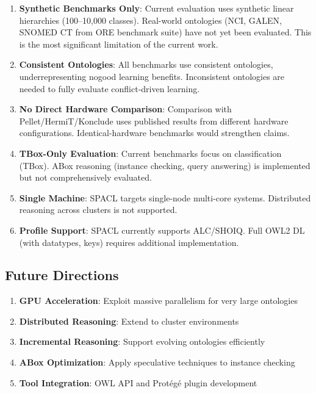\documentclass[preprint,12pt]{elsarticle}
\begin{document}
\begin{enumerate}
    \item \textbf{Synthetic Benchmarks Only}: Current evaluation uses synthetic linear hierarchies (100--10,000 classes). Real-world ontologies (NCI, GALEN, SNOMED CT from ORE benchmark suite) have not yet been evaluated. This is the most significant limitation of the current work.
    
    \item \textbf{Consistent Ontologies}: All benchmarks use consistent ontologies, underrepresenting nogood learning benefits. Inconsistent ontologies are needed to fully evaluate conflict-driven learning.
    
    \item \textbf{No Direct Hardware Comparison}: Comparison with Pellet/HermiT/Konclude uses published results from different hardware configurations. Identical-hardware benchmarks would strengthen claims.
    
    \item \textbf{TBox-Only Evaluation}: Current benchmarks focus on classification (TBox). ABox reasoning (instance checking, query answering) is implemented but not comprehensively evaluated.
    
    \item \textbf{Single Machine}: SPACL targets single-node multi-core systems. Distributed reasoning across clusters is not supported.
    
    \item \textbf{Profile Support}: SPACL currently supports ALC/SHOIQ. Full OWL2 DL (with datatypes, keys) requires additional implementation.
\end{enumerate}

\subsection{Future Directions}
\label{sec:future}

\begin{enumerate}
    \item \textbf{GPU Acceleration}: Exploit massive parallelism for very large ontologies
    \item \textbf{Distributed Reasoning}: Extend to cluster environments
    \item \textbf{Incremental Reasoning}: Support evolving ontologies efficiently
    \item \textbf{ABox Optimization}: Apply speculative techniques to instance checking
    \item \textbf{Tool Integration}: OWL API and Protégé plugin development
\end{enumerate}
\end{document}
